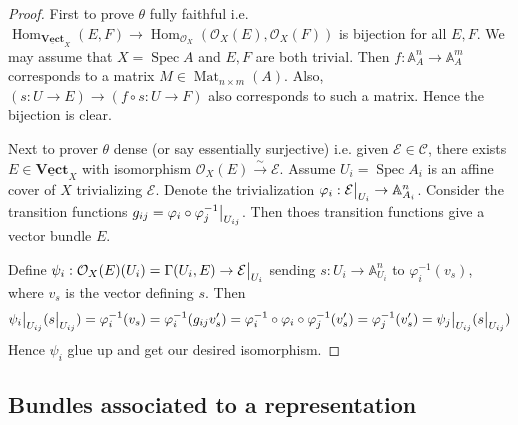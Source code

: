 \documentclass{ctexart}
\renewcommand{\hom}{\operatorname{Hom}}
\newcommand{\spec}{\operatorname{Spec}}
\newcommand{\vectorbundle}{\underline{\mathbf{Vect}}}
\newcommand{\matrices}[2]{\operatorname{Mat}_{#1}(#2)}
\begin{document}
\begin{proof}
    First to prove $\theta$ fully faithful i.e. $\hom_{\vectorbundle_{X}}(E, F) \rightarrow \hom_{\mathcal{O}_{X}}(\mathcal{O}_{X}(E), \mathcal{O}_{X}(F))$ is bijection for all $E, F$.
    We may assume that $X = \spec A$ and $E, F$ are both trivial.
    Then $f: \mathbb{A}_{A}^{n} \rightarrow \mathbb{A}_{A}^{m}$ corresponds to a matrix $M\in \matrices{n \times m}{A}$.
    Also, $(s: U \rightarrow E) \rightarrow (f \circ s: U \rightarrow F)$ also corresponds to such a matrix.
    Hence the bijection is clear.
    \par
    Next to prover $\theta$ dense (or say essentially surjective) i.e. given $\mathcal{E}\in \mathcal{C}$, there exists $E\in \vectorbundle_{X}$ with isomorphism $\mathcal{O}_{X}(E) \overset{\sim}{\rightarrow} \mathcal{E}$.
    Assume $U_{i} = \spec A_{i}$ is an affine cover of $X$ trivializing $\mathcal{E}$.
    Denote the trivialization $\varphi_{i}: \mathcal{E}\big{|}_{U_{i}} \rightarrow \mathbb{A}_{A_{i}}^{n}$.
    Consider the transition functions $g_{ij} = \varphi_{i} \circ \varphi_{j}^{-1}\big{|}_{U_{ij}}$.
    Then thoes transition functions give a vector bundle $E$.
    \par
    Define $\psi_{i}: \mathcal{O}_{X}(E)(U_{i}) = \Gamma(U_{i}, E) \rightarrow \mathcal{E}\big{|}_{U_{i}}$ sending $s: U_{i} \rightarrow \mathbb{A}_{U_{i}}^{n}$ to $\varphi_{i}^{-1}(v_{s})$,
    where $v_{s}$ is the vector defining $s$.
    Then 
    \begin{equation}
        \psi_{i}\big{|}_{U_{ij}}(s\big{|}_{U_{ij}}) = \varphi_{i}^{-1}(v_{s}) = \varphi_{i}^{-1}(g_{ij}v_{s}') = \varphi_{i}^{-1} \circ \varphi_{i} \circ \varphi_{j}^{-1}(v_{s}') = \varphi_{j}^{-1}(v_{s}') = \psi_{j}\big{|}_{U_{ij}}(s\big{|}_{U_{ij}})
    \end{equation}
    Hence $\psi_{i}$ glue up and get our desired isomorphism.
\end{proof}

\subsection{Bundles associated to a representation}
\label{subsection:Vector_Bundles_Bundles_associated_to_a_representation}
\end{document}
